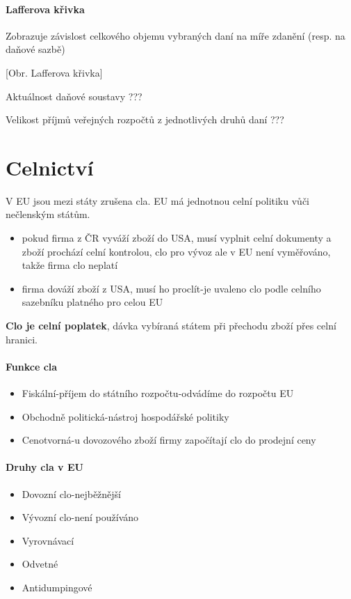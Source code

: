 \paragraph{Lafferova křivka}
Zobrazuje závislost celkového objemu vybraných daní na míře zdanění (resp. na daňové sazbě)

[Obr. Lafferova křivka]

Aktuálnost daňové soustavy ???

Velikost příjmů veřejných rozpočtů z jednotlivých druhů daní ???

\section*{Celnictví}

V EU jsou mezi státy zrušena cla. EU má jednotnou celní politiku vůči nečlenským státům.
\begin{itemize}
    \item pokud firma z ČR vyváží zboží do USA, musí vyplnit celní dokumenty a zboží prochází celní kontrolou, clo pro vývoz ale v EU není vyměřováno, takže firma clo neplatí
    \item firma dováží zboží z USA, musí ho proclít-je uvaleno clo podle celního sazebníku platného pro celou EU
\end{itemize}

\textbf{Clo je celní poplatek}, dávka vybíraná státem při přechodu zboží přes celní hranici.

\paragraph{Funkce cla}
\begin{itemize}
    \item Fiskální-příjem do státního rozpočtu-odvádíme do rozpočtu EU
    \item Obchodně politická-nástroj hospodářské politiky
    \item Cenotvorná-u dovozového zboží firmy započítají clo do prodejní ceny
\end{itemize}

\paragraph{Druhy cla v EU}
\begin{itemize}
    \item Dovozní clo-nejběžnější
    \item Vývozní clo-není používáno
    \item Vyrovnávací
    \item Odvetné
    \item Antidumpingové
\end{itemize}

